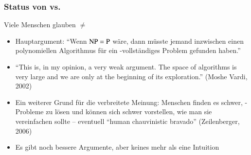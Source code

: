 \documentclass[onlymath]{beamer}
\begin{document}
% 
%    

\begin{frame}\frametitle{Status von  vs. }

  Viele Menschen glauben  ${}\neq{}$ 
	\begin{itemize}
	\item Hauptargument: "`Wenn ${\textsc{NP}} = {\textsc{P}}$ wäre, dann müsste jemand inzwischen einen polynomiellen Algorithmus für ein -vollständiges Problem gefunden haben."'
	\item ``This is, in my opinion, a very weak argument. The space of algorithms is very large and we are only at the beginning of its exploration.'' (Moshe Vardi, 2002)
	\item Ein weiterer Grund für die verbreitete Meinung: Menschen finden es schwer, -Probleme zu lösen und können sich schwer vorstellen, wie man sie vereinfachen sollte
	-- eventuell ``human chauvinistic bravado'' (Zeilenberger, 2006)
	\item Es gibt noch bessere Argumente, aber keines mehr als eine Intuition
	\end{itemize}
\end{frame}
\end{document}
